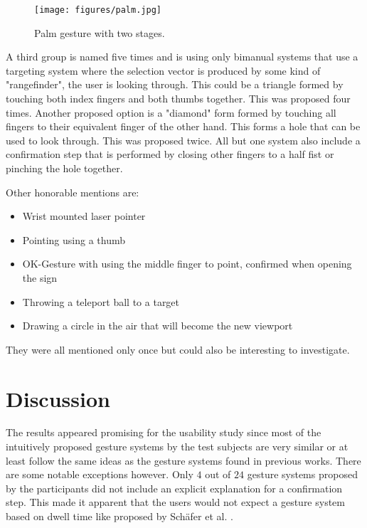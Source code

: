 \begin{figure}[!ht]
    \centering
    \texttt{[image: figures/palm.jpg]}
    \caption{Palm gesture with two stages.}
    \label{fig:palm2}
\end{figure}

A third group is named five times and is using only bimanual systems that use a targeting system where the selection vector is produced by some kind of "rangefinder", the user is looking through. This could be a triangle formed by touching both index fingers and both thumbs together. This was proposed four times. Another proposed option is a "diamond" form formed by touching all fingers to their equivalent finger of the other hand. This forms a hole that can be used to look through. This was proposed twice. All but one system also include a confirmation step that is performed by closing other fingers to a half fist or pinching the hole together.

Other honorable mentions are:
\begin{itemize}
    \item Wrist mounted laser pointer
    \item Pointing using a thumb
    \item OK-Gesture with using the middle finger to point, confirmed when opening the sign
    \item Throwing a teleport ball to a target
    \item Drawing a circle in the air that will become the new viewport
\end{itemize}

They were all mentioned only once but could also be interesting to investigate.

\section{Discussion}
The results appeared promising for the usability study since most of the intuitively proposed gesture systems by the test subjects are very similar or at least follow the same ideas as the gesture systems found in previous works. There are some notable exceptions however. Only $4$ out of $24$ gesture systems proposed by the participants did not include an explicit explanation for a confirmation step. This made it apparent that the users would not expect a gesture system based on dwell time like proposed by Schäfer et al. \cite{Schafer2021}.